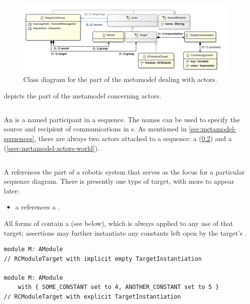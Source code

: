 \begin{figure}
	\centering
	\includegraphics[width=\textwidth]{diagrams/Actors}
	\caption{Class diagram for the part of the \langname{} metamodel dealing with actors.}
	\label{fig:metamodel-actors}
\end{figure}

 depicts the part of the metamodel concerning
actors.

\subsection{\mactor}

An \mactor{} is a named participant in a sequence.  The names can be used to
specify the source and recipient of communications in \mmessagespec{}s.
As mentioned in
\cref{sec:metamodel-sequences}, there are always two actors
attached to a sequence: a \mtarget{} (\cref{ssec:metamodel-actors-target})
and a \mworld{} (\cref{ssec:metamodel-actors-world}).

\subsection{\mtarget}\label{ssec:metamodel-actors-target}

A \mtarget{} references the part of a robotic system that serves as the focus
for a particular sequence diagram.  There is
presently one type of target, with more to appear later:

\begin{itemize}
\item
	a \mrcmoduletarget{} references a \mrcmodule.
\end{itemize}

All forms of \mtarget{} contain a \mtargetinstantiation{} (see below), which
is always applied to any use of that target; assertions may further instantiate
any constants left open by the target's \mtargetinstantiation.

\begin{lstlisting}[style=Example]
module M: AModule
// RCModuleTarget with implicit empty TargetInstantiation

module M: AModule
    with { SOME_CONSTANT set to 4, ANOTHER_CONSTANT set to 5 }
// RCModuleTarget with explicit TargetInstantiation
\end{lstlisting}

